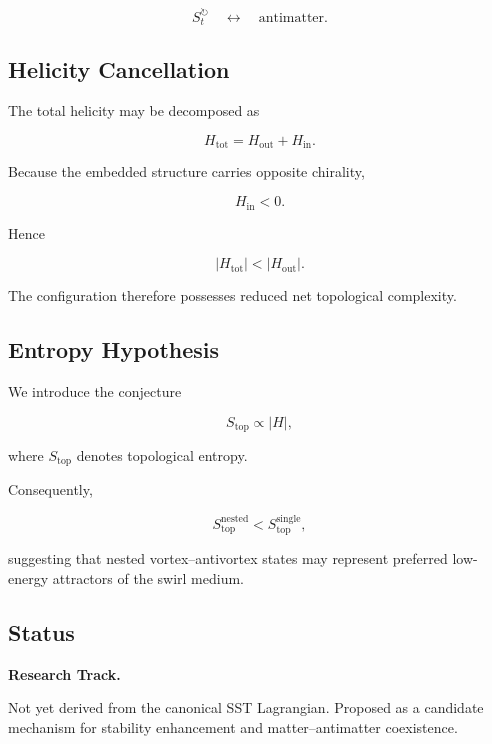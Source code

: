         \[
            S_t^{\circlearrowright}
            \quad\leftrightarrow\quad
            \text{antimatter}.
        \]
    
    \subsection{Helicity Cancellation}
        
        The total helicity may be decomposed as
        
        \[
            H_{\mathrm{tot}}
            =
            H_{\mathrm{out}}
            +
            H_{\mathrm{in}}.
        \]
        
        Because the embedded structure carries opposite chirality,
        
        \[
            H_{\mathrm{in}}<0.
        \]
        
        Hence
        
        \[
            |H_{\mathrm{tot}}|
            <
            |H_{\mathrm{out}}|.
        \]
        
        The configuration therefore possesses reduced net topological complexity.
    
    \subsection{Entropy Hypothesis}
        
        We introduce the conjecture
        
        \[
            S_{\mathrm{top}}
            \propto
            |H|,
        \]
        
        where $S_{\mathrm{top}}$ denotes topological entropy.
        
        Consequently,
        
        \[
            S_{\mathrm{top}}^{\mathrm{nested}}
            <
            S_{\mathrm{top}}^{\mathrm{single}},
        \]
        
        suggesting that nested vortex--antivortex states may represent preferred
        low-energy attractors of the swirl medium.
    
    \subsection{Status}
        
        \textbf{Research Track.}
        
        Not yet derived from the canonical SST Lagrangian.
        Proposed as a candidate mechanism for stability enhancement and
        matter--antimatter coexistence.
    
